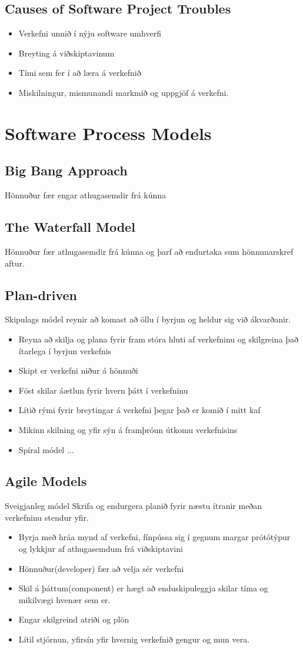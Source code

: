 \documentclass[openany]{article}
\begin{document}
\subsection{Causes of Software Project Troubles}
\begin{itemize}
	\item Verkefni unnið í nýju software umhverfi
	\item Breyting á viðskiptavinum 
	\item Tími sem fer í að læra á verkefnið
	\item Miskilningur, mismunandi markmið og uppgjöf á verkefni.
\end{itemize}
\section{Software Process Models}
\subsection{Big Bang Approach}
Hönnuður fær engar athugasemdir frá kúnna
\subsection{The Waterfall Model}
Hönnuður fær athugasemdir frá kúnna og þarf að endurtaka sum hönnunarskref aftur.
\subsection{Plan-driven}
Skipulags módel reynir að komast að öllu í byrjun og heldur sig við ákvarðanir.
\begin{itemize}
	\item Reyna að skilja og plana fyrir fram stóra hluti af verkefninu og skilgreina það ítarlega í byrjun verkefnis
	\item Skipt er verkefni niður á hönnuði
	\item Föst skilar áætlun fyrir hvern þátt í verkefninu
	\item Lítið rými fyrir breytingar á verkefni þegar það er komið í mitt kaf
	\item Mikinn skilning og yfir sýn á framþróun útkomu verkefnisins
	\item Spíral módel ...
\end{itemize}
\subsection{Agile Models}
Sveigjanleg módel Skrifa og endurgera planið fyrir næstu ítranir meðan verkefninu stendur yfir.
\begin{itemize}
	\item Byrja með hráa mynd af verkefni, fínpússa sig í gegnum margar prótótýpur og lykkjur af athugasemdum frá viðskiptavini
	\item Hönnuður(developer) fær að velja sér verkefni
	\item Skil á þáttum(component) er hægt að enduskipuleggja skilar tíma og mikilvægi hvenær sem er.
	\item Engar skilgreind atriði og plön
	\item Lítil stjórnun, yfirsín yfir hvernig verkefnið gengur og mun vera.
\end{itemize}
\end{document}
